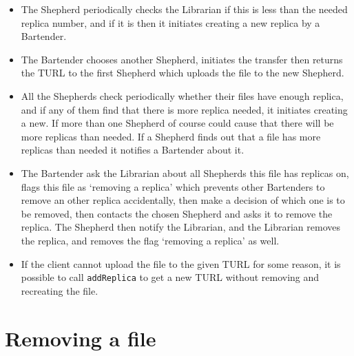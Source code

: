 \documentclass{book}
\begin{document}
\begin{itemize}
\item The Shepherd periodically checks the Librarian if this is less than the needed replica number, and if it is then it initiates creating a new replica by a Bartender.
\item The Bartender chooses another Shepherd, initiates the transfer then returns the TURL to the  first Shepherd which uploads the file to the new Shepherd.
\item All the Shepherds check periodically whether their files have enough replica, and if any of them find that there is more replica needed, it initiates creating a new. If more than one Shepherd of course could cause that there will be more replicas than needed. If a Shepherd finds out that a file has more replicas than needed it notifies a Bartender about it.
\item The Bartender ask the Librarian about all Shepherds this file has replicas on, flags this file as `removing a replica' which prevents other Bartenders to remove an other replica accidentally, then make a decision of which one is to be removed, then contacts the chosen Shepherd and asks it to remove the replica. The Shepherd then notify the Librarian, and the Librarian removes the replica, and removes the flag `removing a replica' as well.
\item If the client cannot upload the file to the given TURL for some reason, it is possible to call \verb#addReplica# to get a new TURL without removing and recreating the file.
\end{itemize}


\section{Removing a file} %
\label{sec:removing_a_file}
\end{document}
